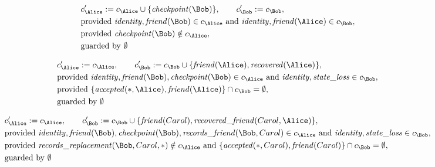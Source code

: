 \begin{align*}
&
c'_
{
\Alice
}
 := 
c_
{
\Alice
}
 \cup 
\{
\mathit{\detokenize{
checkpoint
}}
(
\Bob
)
\}
, \qquad 
c'_
{
\Bob
}
 := 
c_
{
\Bob
}
,\\
&
\text{provided } 
\mathit{\detokenize{
identity
}}
,
\mathit{\detokenize{
friend
}}
(
\Bob
)
 \in c_
{
\Alice
}
 \text{ and } 
\mathit{\detokenize{
identity
}}
,
\mathit{\detokenize{
friend
}}
(
\Alice
)
 \in c_
{
\Bob
}
,\\
&
\text{provided } 
\mathit{\detokenize{
checkpoint
}}
(
\Bob
)
 \notin c_
{
\Alice
}
,\\
&
\text{guarded by } \emptyset
\end{align*}

\begin{align*}
&
c'_
{
\Alice
}
 := 
c_
{
\Alice
}
, \qquad 
c'_
{
\Bob
}
 := 
c_
{
\Bob
}
 \cup 
\{
\mathit{\detokenize{
friend
}}
(
\Alice
)
,
\mathit{\detokenize{
recovered
}}
(
\Alice
)
\}
,\\
&
\text{provided } 
\mathit{\detokenize{
identity
}}
,
\mathit{\detokenize{
friend
}}
(
\Bob
)
,
\mathit{\detokenize{
checkpoint
}}
(
\Bob
)
 \in c_
{
\Alice
}
 \text{ and } 
\mathit{\detokenize{
identity
}}
,
\mathit{\detokenize{
state_loss
}}
 \in c_
{
\Bob
}
,\\
&
\text{provided } 
\{
\mathit{\detokenize{
accepted
}}
(
\ast
,
\Alice
)
,
\mathit{\detokenize{
friend
}}
(
\Alice
)
\}
 \cap c_
{
\Bob
}
 = \emptyset
,\\
&
\text{guarded by } \emptyset
\end{align*}

\begin{align*}
&
c'_
{
\Alice
}
 := 
c_
{
\Alice
}
, \qquad 
c'_
{
\Bob
}
 := 
c_
{
\Bob
}
 \cup 
\{
\mathit{\detokenize{
friend
}}
(
Carol
)
,
\mathit{\detokenize{
recovered_friend
}}
(
Carol
,
\Alice
)
\}
,\\
&
\text{provided } 
\mathit{\detokenize{
identity
}}
,
\mathit{\detokenize{
friend
}}
(
\Bob
)
,
\mathit{\detokenize{
checkpoint
}}
(
\Bob
)
,
\mathit{\detokenize{
records_friend
}}
(
\Bob
,
Carol
)
 \in c_
{
\Alice
}
 \text{ and } 
\mathit{\detokenize{
identity
}}
,
\mathit{\detokenize{
state_loss
}}
 \in c_
{
\Bob
}
,\\
&
\text{provided } 
\mathit{\detokenize{
records_replacement
}}
(
\Bob
,
Carol
,
\ast
)
 \notin c_
{
\Alice
}
 \text{ and } 
\{
\mathit{\detokenize{
accepted
}}
(
\ast
,
Carol
)
,
\mathit{\detokenize{
friend
}}
(
Carol
)
\}
 \cap c_
{
\Bob
}
 = \emptyset
,\\
&
\text{guarded by } \emptyset
\end{align*}
